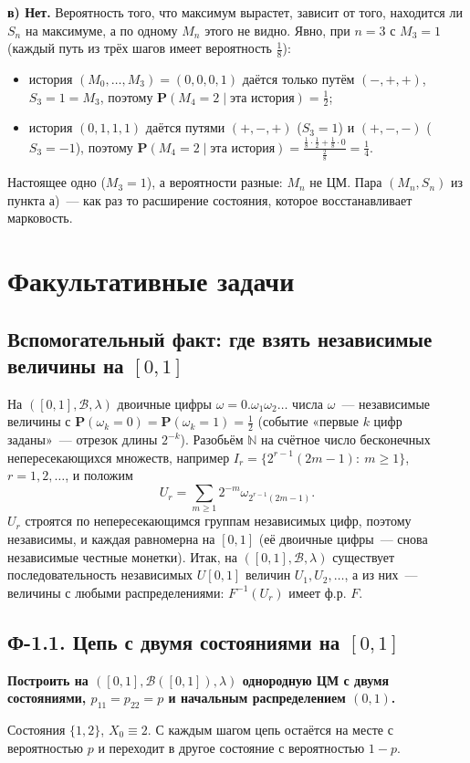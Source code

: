 \documentclass[11pt,a4paper]{article}
\theoremstyle{definition}
\newcommand{\PP}{\mathbf P}
\newcommand{\N}{\mathbb N}
\newcommand{\B}{\mathcal B}
\newcommand{\1}{\mathbf 1}
\newenvironment{task}[1]{\par\medskip\noindent\colorbox{black!7}{\parbox{\dimexpr\linewidth-2\fboxsep}{\textbf{#1}}}\par\smallskip}{\par}
\begin{document}
\textbf{в) Нет.} Вероятность того, что максимум вырастет, зависит от того,
находится ли $S_n$ на максимуме, а по одному $M_n$ этого не видно. Явно, при
$n=3$ с $M_3=1$ (каждый путь из трёх шагов имеет вероятность $\frac18$):
\begin{itemize}[nosep]
\item история $(M_0,\dots,M_3)=(0,0,0,1)$ даётся только путём $(-,+,+)$,
$S_3=1=M_3$, поэтому $\PP(M_4=2\mid\text{эта история})=\frac12$;
\item история $(0,1,1,1)$ даётся путями $(+,-,+)$ ($S_3=1$) и
$(+,-,-)$ ($S_3=-1$), поэтому
$\PP(M_4=2\mid\text{эта история})=\frac{\frac18\cdot\frac12+\frac18\cdot0}{\frac28}=\frac14$.
\end{itemize}
Настоящее одно ($M_3=1$), а вероятности разные: $M_n$ не ЦМ. Пара
$(M_n,S_n)$ из пункта а)~--- как раз то расширение состояния, которое
восстанавливает марковость.

\section{Факультативные задачи}\label{sec:fac}

\subsection*{Вспомогательный факт: где взять независимые величины на $[0,1]$}

На $([0,1],\B,\lambda)$ двоичные цифры $\omega=0.\omega_1\omega_2\dots$ числа
$\omega$~--- независимые величины с $\PP(\omega_k=0)=\PP(\omega_k=1)=\frac12$
(событие «первые $k$ цифр заданы»~--- отрезок длины $2^{-k}$). Разобьём $\N$ на
счётное число бесконечных непересекающихся множеств, например
$I_r=\{2^{r-1}(2m-1):\ m\ge1\}$, $r=1,2,\dots$, и положим
\[
U_r=\sum_{m\ge1}2^{-m}\omega_{2^{r-1}(2m-1)} .
\]
$U_r$ строятся по непересекающимся группам независимых цифр, поэтому
независимы, и каждая равномерна на $[0,1]$ (её двоичные цифры~--- снова
независимые честные монетки). Итак, на $([0,1],\B,\lambda)$ существует
последовательность независимых $U[0,1]$ величин $U_1,U_2,\dots$, а из них~---
величины с любыми распределениями: $F^{-1}(U_r)$ имеет ф.р. $F$.

\subsection{Ф-1.1. Цепь с двумя состояниями на $[0,1]$}

\begin{task}{Построить на $([0,1],\B([0,1]),\lambda)$ однородную ЦМ с двумя
состояниями, $p_{11}=p_{22}=p$ и начальным распределением $(0,1)$.}
\end{task}
Состояния $\{1,2\}$, $X_0\equiv2$. С каждым шагом цепь остаётся на месте с
вероятностью $p$ и переходит в другое состояние с вероятностью $1-p$.
\end{document}
